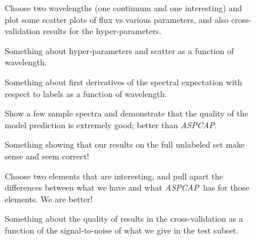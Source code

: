 \documentclass[12pt,preprint]{aastex}
\newcommand{\project}[1]{\textsl{#1}}
\newcommand{\acronym}[1]{{\small{#1}}}
\newcommand{\aspcap}{\project{\acronym{ASPCAP}}}
\begin{document}
\clearpage

\begin{figure}[p]
\caption{Choose two wavelengths (one continuum and one interesting)
  and plot some scatter plots of flux vs various parameters, and also
  cross-validation results for the
  hyper-parameters.\label{fig:onewavelength}}
\end{figure}

\begin{figure}[p]
\caption{Something about hyper-parameters and scatter as a function of
  wavelength.\label{fig:hyperpars}}
\end{figure}

\begin{figure}[p]
\caption{Something about first derivatives of the spectral expectation
  with respect to labels as a function of
  wavelength.\label{fig:derivatives}}
\end{figure}

\begin{figure}[p]
\caption{Show a few sample spectra and demonstrate that the quality of
  the model prediction is extremely good; better than
  \aspcap.\label{fig:correctness}}
\end{figure}

\begin{figure}[p]
\caption{Something showing that our results on the full unlabeled set
  make sense and seem correct!\label{fig:fulltest}}
\end{figure}

\begin{figure}[p]
\caption{Choose two elements that are interesting, and pull apart the
  differences between what we have and what \aspcap\ has for those
  elements.  We are better!\label{fig:elements}}
\end{figure}

\begin{figure}[p]
\caption{Something about the quality of results in the
  cross-validation as a function of the signal-to-noise of what we
  give in the test subset.\label{fig:snr}}
\end{figure}
\end{document}
